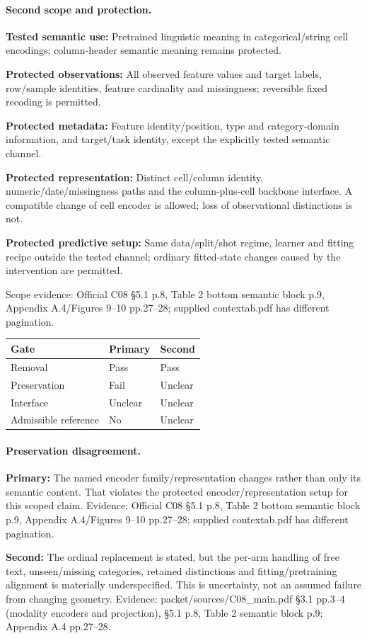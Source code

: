 \documentclass[10pt]{article}
\begin{document}
\paragraph{Second scope and protection.}
\textbf{Tested semantic use:} Pretrained linguistic meaning in categorical/string cell encodings; column-header semantic meaning remains protected.\par
\textbf{Protected observations:} All observed feature values and target labels, row/sample identities, feature cardinality and missingness; reversible fixed recoding is permitted.\par
\textbf{Protected metadata:} Feature identity/position, type and category-domain information, and target/task identity, except the explicitly tested semantic channel.\par
\textbf{Protected representation:} Distinct cell/column identity, numeric/date/missingness paths and the column-plus-cell backbone interface. A compatible change of cell encoder is allowed; loss of observational distinctions is not.\par
\textbf{Protected predictive setup:} Same data/split/shot regime, learner and fitting recipe outside the tested channel; ordinary fitted-state changes caused by the intervention are permitted.\par
Scope evidence: Official C08 §5.1 p.8, Table 2 bottom semantic block p.9, Appendix A.4/Figures 9--10 pp.27--28; supplied contextab.pdf has different pagination.\par
\begin{tabular}{lll}\toprule Gate & Primary & Second \\ \midrule
Removal & Pass & Pass \\
Preservation & Fail & Unclear \\
Interface & Unclear & Unclear \\
Admissible reference & No & Unclear \\
\bottomrule\end{tabular}
\paragraph{Preservation disagreement.}
\textbf{Primary:} The named encoder family/representation changes rather than only its semantic content. That violates the protected encoder/representation setup for this scoped claim. Evidence: Official C08 §5.1 p.8, Table 2 bottom semantic block p.9, Appendix A.4/Figures 9--10 pp.27--28; supplied contextab.pdf has different pagination.\par
\textbf{Second:} The ordinal replacement is stated, but the per-arm handling of free text, unseen/missing categories, retained distinctions and fitting/pretraining alignment is materially underspecified. This is uncertainty, not an assumed failure from changing geometry. Evidence: packet/sources/C08\_main.pdf §3.1 pp.3--4 (modality encoders and projection), §5.1 p.8, Table 2 semantic block p.9; Appendix A.4 pp.27--28.\par
\end{document}
